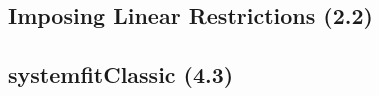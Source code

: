 \documentclass[12pt,english]{scrartcl}
\begin{document}
\subsection{Imposing Linear Restrictions (2.2)}
% 
%
\subsection{systemfitClassic (4.3)}
% 
%
\end{document}
